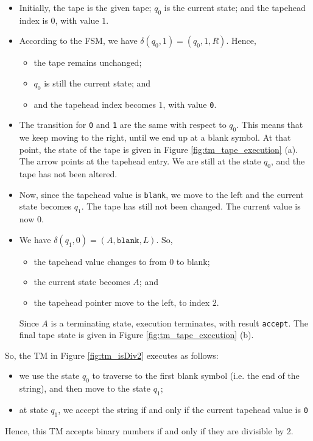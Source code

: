 \begin{itemize}
    \item Initially, the tape is the given tape; $q_0$ is the current state; and the tapehead index is $0$, with value $1$.
    
    \item According to the FSM, we have $\delta(q_0, 1) = (q_0, 1, R)$. Hence,
    \begin{itemize}
        \item the tape remains unchanged;
        \item $q_0$ is still the current state; and
        \item and the tapehead index becomes $1$, with value \texttt{0}.
    \end{itemize}
    
    \item The transition for \texttt{0} and \texttt{1} are the same with respect to $q_0$. This means that we keep moving to the right, until we end up at a blank symbol. At that point, the state of the tape is given in Figure \ref{fig:tm_tape_execution} (a). The arrow points at the tapehead entry. We are still at the state $q_0$, and the tape has not been altered.
    
    \item Now, since the tapehead value is \texttt{blank}, we move to the left and the current state becomes $q_1$. The tape has still not been changed. The current value is now $0$.
    
    \item We have $\delta(q_1, 0) = (A, \texttt{blank}, L)$. So, 
    \begin{itemize}
        \item the tapehead value changes to from $0$ to blank;
        \item the current state becomes $A$; and
        \item the tapehead pointer move to the left, to index $2$.
    \end{itemize}
    Since $A$ is a terminating state, execution terminates, with result \texttt{accept}. The final tape state is given in Figure \ref{fig:tm_tape_execution} (b).
    
\end{itemize}
So, the TM in Figure \ref{fig:tm_isDiv2} executes as follows:
\begin{itemize}
    \item we use the state $q_0$ to traverse to the first blank symbol (i.e. the end of the string), and then move to the state $q_1$;
    \item at state $q_1$, we accept the string if and only if the current tapehead value is \texttt{0}
\end{itemize}
Hence, this TM accepts binary numbers if and only if they are divisible by 2.

